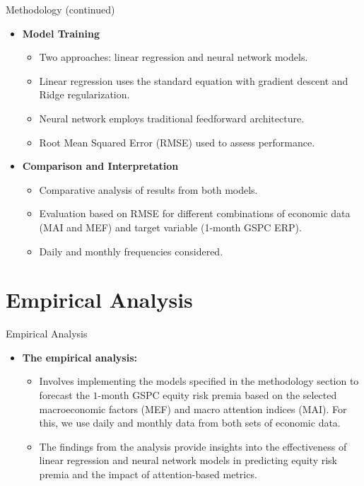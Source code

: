 \documentclass{beamer}
\begin{document}
\begin{frame}{Methodology (continued)}
  \begin{itemize}
    \item \textbf{Model Training}
      \begin{itemize}
        \item Two approaches: linear regression and neural network models.
        \item Linear regression uses the standard equation with gradient descent and Ridge regularization.
        \item Neural network employs traditional feedforward architecture.
        \item Root Mean Squared Error (RMSE) used to assess performance.
      \end{itemize}
    \item \textbf{Comparison and Interpretation}
      \begin{itemize}
        \item Comparative analysis of results from both models.
        \item Evaluation based on RMSE for different combinations of economic data (MAI and MEF) and target variable (1-month GSPC ERP).
        \item Daily and monthly frequencies considered.
      \end{itemize}
  \end{itemize}
\end{frame}

\section{Empirical Analysis}
\begin{frame}{Empirical Analysis}
\begin{itemize}
\item\textbf{The empirical analysis:}
      \begin{itemize}
        \item Involves implementing the models specified in the methodology section to forecast the $1$-month GSPC equity risk premia based on the selected macroeconomic factors (MEF) and macro attention indices (MAI). For this, we use daily and monthly data from both sets of economic data.
        \item The findings from the analysis provide insights into the effectiveness of linear regression and neural network models in predicting equity risk premia and the impact of attention-based metrics.
        \end{itemize}
            \end{itemize}
\end{frame}
\end{document}
